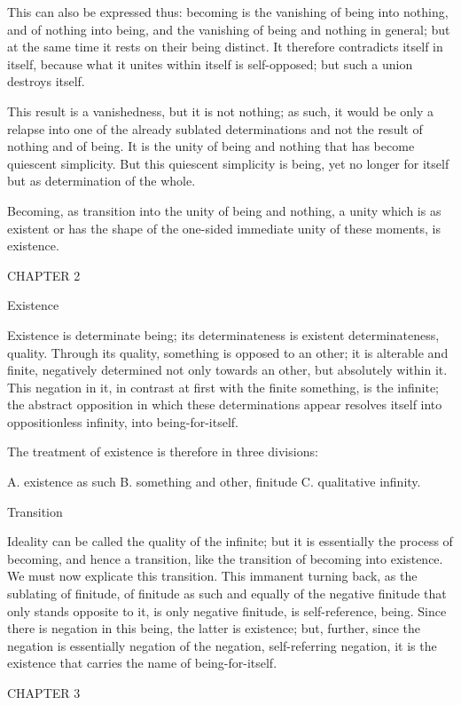 This can also be expressed thus:
becoming is the vanishing of being into nothing,
and of nothing into being,
and the vanishing of being and nothing in general;
but at the same time it rests on their being distinct.
It therefore contradicts itself in itself,
because what it unites within itself is self-opposed;
but such a union destroys itself.

This result is a vanishedness, but it is not nothing;
as such, it would be only a relapse into one of
the already sublated determinations
and not the result of nothing and of being.
It is the unity of being and nothing
that has become quiescent simplicity.
But this quiescent simplicity is being,
yet no longer for itself but as determination of the whole.

Becoming, as transition into
the unity of being and nothing,
a unity which is as existent
or has the shape of the one-sided
immediate unity of these moments,
is existence.

CHAPTER 2

Existence

Existence is determinate being;
its determinateness is existent determinateness, quality.
Through its quality, something is opposed to an other;
it is alterable and finite,
negatively determined not only towards an other,
but absolutely within it.
This negation in it, in contrast at first
with the finite something, is the infinite;
the abstract opposition in which these determinations appear
resolves itself into oppositionless infinity,
into being-for-itself.

The treatment of existence is therefore in three divisions:

A. existence as such
B. something and other, finitude
C. qualitative infinity.

Transition

Ideality can be called the quality of the infinite;
but it is essentially the process of becoming,
and hence a transition, like the transition
of becoming into existence.
We must now explicate this transition.
This immanent turning back, as the sublating of finitude,
of finitude as such and equally of the negative finitude
that only stands opposite to it, is only negative finitude,
is self-reference, being.
Since there is negation in this being, the latter is existence;
but, further, since the negation is essentially
negation of the negation, self-referring negation,
it is the existence that carries the name of being-for-itself.

CHAPTER 3


